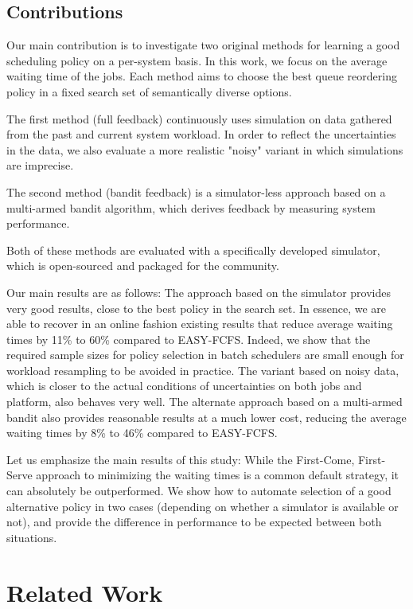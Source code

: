 \documentclass[sigconf,anonymous]{acmart}
\begin{document}
\subsection{Contributions}

Our main contribution is to investigate two original methods for learning a
good scheduling policy on a per-system basis. In this work, we focus on the
average waiting time of the jobs. Each method aims to choose the best queue
reordering policy in a fixed search set of semantically diverse options.

The first method (full feedback) continuously uses simulation on data gathered
from the past and current system workload. In order to reflect the
uncertainties in the data, we also evaluate a more realistic "noisy" variant in
which simulations are imprecise.

The second method (bandit feedback) is a simulator-less approach based on a
multi-armed bandit algorithm, which derives feedback by measuring system
performance.

Both of these methods are evaluated with a specifically developed simulator,
which is open-sourced and packaged for the community.


Our main results are as follows: The approach based on the simulator provides
very good results, close to the best policy in the search set. In essence, we
are able to recover in an online fashion existing results that reduce average
waiting times by 11\% to 60\% compared to EASY-FCFS.  Indeed, we show
that the required sample sizes for policy selection in batch schedulers are
small enough for workload resampling to be avoided in practice.  The variant
based on noisy data, which is closer to the actual conditions of uncertainties on
both jobs and platform, also behaves very well. The alternate approach based on
a multi-armed bandit also provides reasonable results at a much lower cost,
reducing the average waiting times by 8\% to 46\% compared to
EASY-FCFS.

Let us emphasize the main results of this study: While the First-Come,
First-Serve approach to minimizing the waiting times is a common default
strategy, it can absolutely be outperformed.  We show how to automate selection
of a good alternative policy in two cases (depending on whether a simulator is
available or not), and provide the difference in performance to be expected
between both situations.

\section{Related Work}
\label{sec:rw}
\end{document}
